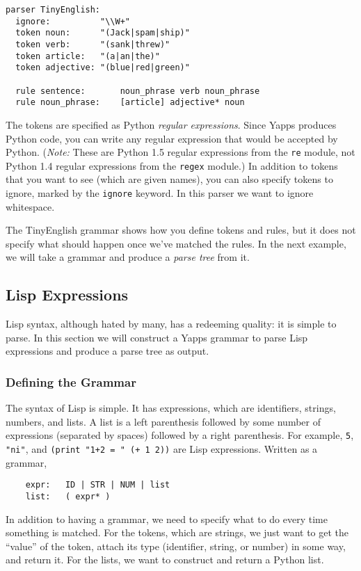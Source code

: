 \documentclass[10pt]{article}
\newcommand{\mysubsection}[1]{\subsection{\textcolor{darkerblue}{#1}}}
\begin{document}
\begin{verbatim}
parser TinyEnglish:
  ignore:          "\\W+"
  token noun:      "(Jack|spam|ship)"
  token verb:      "(sank|threw)"
  token article:   "(a|an|the)"
  token adjective: "(blue|red|green)"

  rule sentence:       noun_phrase verb noun_phrase
  rule noun_phrase:    [article] adjective* noun
\end{verbatim}

The tokens are specified as Python \emph{regular expressions}.  Since
Yapps produces Python code, you can write any regular expression that
would be accepted by Python.  (\emph{Note:} These are Python 1.5
regular expressions from the \texttt{re} module, not Python 1.4
regular expressions from the \texttt{regex} module.)  In addition to
tokens that you want to see (which are given names), you can also
specify tokens to ignore, marked by the \texttt{ignore} keyword.  In
this parser we want to ignore whitespace.

The TinyEnglish grammar shows how you define tokens and rules, but it
does not specify what should happen once we've matched the rules.  In
the next example, we will take a grammar and produce a \emph{parse
tree} from it.

\mysubsection{Lisp Expressions}

Lisp syntax, although hated by many, has a redeeming quality: it is
simple to parse.  In this section we will construct a Yapps grammar to
parse Lisp expressions and produce a parse tree as output.

\subsubsection*{Defining the Grammar}

The syntax of Lisp is simple.  It has expressions, which are
identifiers, strings, numbers, and lists.  A list is a left
parenthesis followed by some number of expressions (separated by
spaces) followed by a right parenthesis.  For example, \verb|5|,
\verb|"ni"|, and \verb|(print "1+2 = " (+ 1 2))| are Lisp expressions.
Written as a grammar,

\begin{verbatim}
    expr:   ID | STR | NUM | list
    list:   ( expr* )  
\end{verbatim}

In addition to having a grammar, we need to specify what to do every
time something is matched.  For the tokens, which are strings, we just
want to get the ``value'' of the token, attach its type (identifier,
string, or number) in some way, and return it.  For the lists, we want
to construct and return a Python list.
\end{document}
